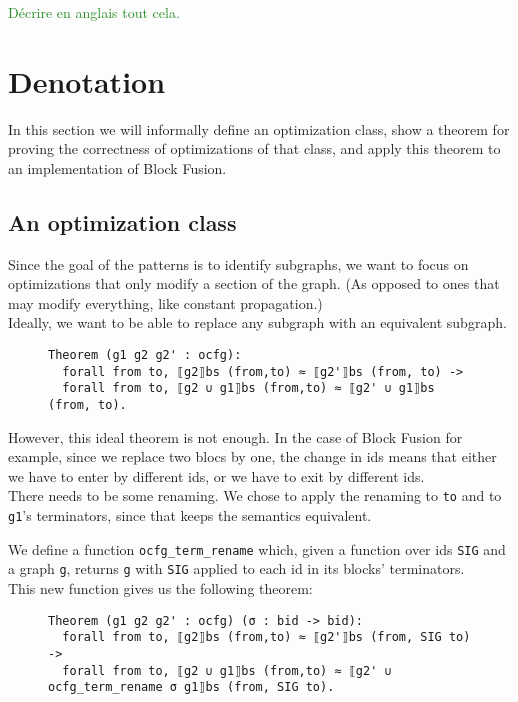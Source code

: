 \documentclass[11pt]{article}
\newcommand{\inlinecoq}[1]{\mbox{\lstinline[style=customcoq,columns=fixed,basewidth=.48em]{#1}}}
\newcommand{\ilc}[1]{\inlinecoq{#1}}
\newcommand{\yz}[1]{\textcolor{ForestGreen}{#1}}
\begin{document}
\yz{Décrire en anglais tout cela.}

\section{Denotation}
\label{sec:deno}

In this section we will informally define an optimization class, show a theorem for proving the correctness of optimizations of that class, and apply this theorem to an implementation of Block Fusion.

\subsection{An optimization class}

Since the goal of the patterns is to identify subgraphs, we want to focus on optimizations that only modify a section of the graph. (As opposed to ones that may modify everything, like constant propagation.)\\
Ideally, we want to be able to replace any subgraph with an equivalent subgraph.

\begin{figure}[h]
\end{figure}
\begin{figure}[h]
  \begin{lstlisting}[style=customcoq,basicstyle=\small\ttfamily]
Theorem (g1 g2 g2' : ocfg):
  forall from to, ⟦g2⟧bs (from,to) ≈ ⟦g2'⟧bs (from, to) ->
  forall from to, ⟦g2 ∪ g1⟧bs (from,to) ≈ ⟦g2' ∪ g1⟧bs (from, to).
  \end{lstlisting}
\end{figure}

However, this ideal theorem is not enough. In the case of Block Fusion for example, since we replace two blocs by one, the change in ids means that either we have to enter by different ids, or we have to exit by different ids.\\
There needs to be some renaming. We chose to apply the renaming to \ilc{to} and to \ilc{g1}'s terminators, since that keeps the semantics equivalent.

We define a function \ilc{ocfg_term_rename} which, given a function over ids \ilc{SIG} and a graph \ilc{g}, returns \ilc{g} with \ilc{SIG} applied to each id in its blocks' terminators.\\
This new function gives us the following theorem:
\begin{figure}[h]
  \begin{lstlisting}[style=customcoq,basicstyle=\small\ttfamily]
Theorem (g1 g2 g2' : ocfg) (σ : bid -> bid):
  forall from to, ⟦g2⟧bs (from,to) ≈ ⟦g2'⟧bs (from, SIG to) ->
  forall from to, ⟦g2 ∪ g1⟧bs (from,to) ≈ ⟦g2' ∪ ocfg_term_rename σ g1⟧bs (from, SIG to).
  \end{lstlisting}
\end{figure}
\end{document}
